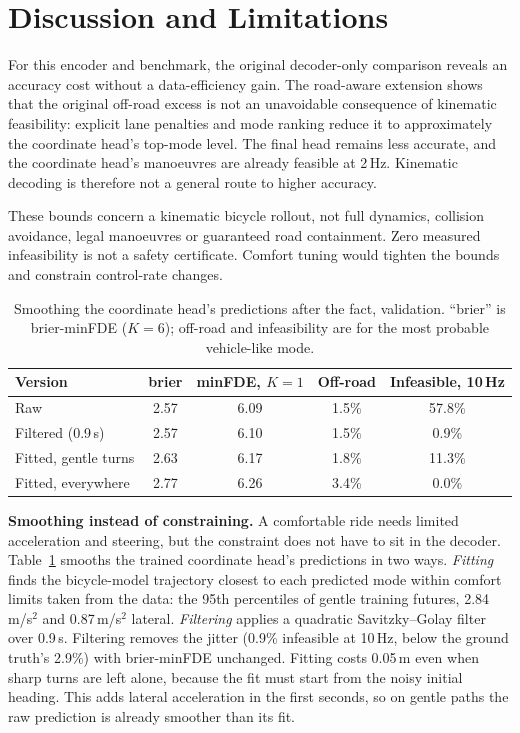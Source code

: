 \documentclass[conference]{IEEEtran}
\begin{document}
\section{Discussion and Limitations}

For this encoder and benchmark, the original decoder-only comparison reveals an accuracy cost
without a data-efficiency gain. The road-aware extension shows that the original off-road excess
is not an unavoidable consequence of kinematic feasibility: explicit lane penalties and mode
ranking reduce it to approximately the coordinate head's top-mode level. The final head remains
less accurate, and the coordinate head's manoeuvres are already feasible at 2\,Hz. Kinematic decoding is therefore not a general route to higher accuracy.

These bounds concern a kinematic bicycle rollout, not full dynamics, collision avoidance, legal
manoeuvres or guaranteed road containment. Zero measured infeasibility is not a safety certificate.
Comfort tuning would tighten the bounds and constrain control-rate changes.

\begin{table}[t]
\centering
\caption{Smoothing the coordinate head's predictions after the fact, validation. ``brier'' is
brier-minFDE ($K{=}6$); off-road and infeasibility are for the most probable vehicle-like mode.}
\label{tab:smooth}
\footnotesize
\setlength{\tabcolsep}{3pt}
\begin{tabular}{lcccc}
\toprule
Version & brier & minFDE, $K{=}1$ & Off-road & Infeasible, 10\,Hz \\
\midrule
Raw & 2.57 & 6.09 & 1.5\% & 57.8\% \\
Filtered (0.9\,s) & 2.57 & 6.10 & 1.5\% & 0.9\% \\
Fitted, gentle turns & 2.63 & 6.17 & 1.8\% & 11.3\% \\
Fitted, everywhere & 2.77 & 6.26 & 3.4\% & 0.0\% \\
\bottomrule
\end{tabular}
\end{table}

\textbf{Smoothing instead of constraining.} A comfortable ride needs limited acceleration and
steering, but the constraint does not have to sit in the decoder. Table~\ref{tab:smooth} smooths
the trained coordinate head's predictions in two ways. \emph{Fitting} finds the bicycle-model
trajectory closest to each predicted mode within comfort limits taken from the data: the 95th
percentiles of gentle training futures, 2.84\,m/s$^2$ and 0.87\,m/s$^2$ lateral. \emph{Filtering}
applies a quadratic Savitzky--Golay filter over 0.9\,s. Filtering removes the jitter (0.9\% infeasible
at 10\,Hz, below the ground truth's 2.9\%) with brier-minFDE unchanged. Fitting costs 0.05\,m even
when sharp turns are left alone, because the fit must start from the noisy initial heading. This
adds lateral acceleration in the first seconds, so on gentle paths the raw prediction is already
smoother than its fit.
\end{document}

